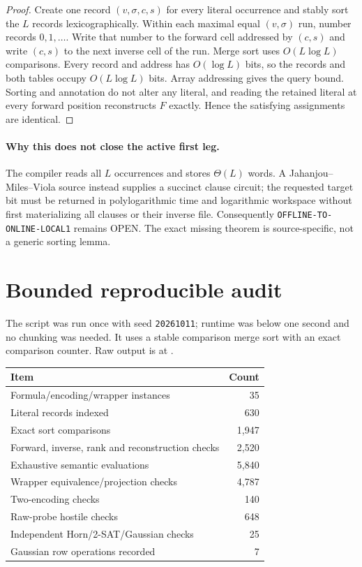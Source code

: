 \documentclass[11pt]{article}
\begin{document}
\begin{proof}
Create one record $(v,\sigma,c,s)$ for every literal occurrence and stably
sort the $L$ records lexicographically.  Within each maximal equal
$(v,\sigma)$ run, number records $0,1,\ldots$.  Write that number to the
forward cell addressed by $(c,s)$ and write $(c,s)$ to the next inverse cell
of the run.  Merge sort uses $O(L\log L)$ comparisons.  Every record and
address has $O(\log L)$ bits, so the records and both tables occupy
$O(L\log L)$ bits.  Array addressing gives the query bound.  Sorting and
annotation do not alter any literal, and reading the retained literal at
every forward position reconstructs $F$ exactly.  Hence the satisfying
assignments are identical.
\end{proof}

\paragraph{Why this does not close the active first leg.}
The compiler reads all $L$ occurrences and stores $\Theta(L)$ words.  A
Jahanjou--Miles--Viola source instead supplies a succinct clause circuit;
the requested target bit must be returned in polylogarithmic time and
logarithmic workspace without first materializing all clauses or their
inverse file.  Consequently \texttt{OFFLINE-TO-ONLINE-LOCAL1} remains OPEN.
The exact missing theorem is source-specific, not a generic sorting lemma.

\section{Bounded reproducible audit}

The script
 was run once with
seed \texttt{20261011}; runtime was below one second and no chunking was
needed.  It uses a stable comparison merge sort with an exact comparison
counter.  Raw output is at
.

\begin{center}\small
\begin{tabular}{@{}lr@{}}
\toprule Item & Count\\ \midrule
Formula/encoding/wrapper instances & 35\\
Literal records indexed & 630\\
Exact sort comparisons & 1,947\\
Forward, inverse, rank and reconstruction checks & 2,520\\
Exhaustive semantic evaluations & 5,840\\
Wrapper equivalence/projection checks & 4,787\\
Two-encoding checks & 140\\
Raw-probe hostile checks & 648\\
Independent Horn/2-SAT/Gaussian checks & 25\\
Gaussian row operations recorded & 7\\
\bottomrule
\end{tabular}
\end{center}
\end{document}
